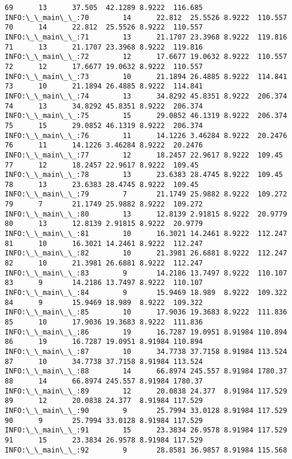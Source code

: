 \documentclass[11pt]{article}
\begin{document}
\begin{Verbatim}[commandchars=\\\{\}]
69      13      37.505  42.1289 8.9222  116.685
INFO:\_\_main\_\_:70        14      22.812  25.5526 8.9222  110.557
70      14      22.812  25.5526 8.9222  110.557
INFO:\_\_main\_\_:71        13      21.1707 23.3968 8.9222  119.816
71      13      21.1707 23.3968 8.9222  119.816
INFO:\_\_main\_\_:72        12      17.6677 19.0632 8.9222  110.557
72      12      17.6677 19.0632 8.9222  110.557
INFO:\_\_main\_\_:73        10      21.1894 26.4885 8.9222  114.841
73      10      21.1894 26.4885 8.9222  114.841
INFO:\_\_main\_\_:74        13      34.8292 45.8351 8.9222  206.374
74      13      34.8292 45.8351 8.9222  206.374
INFO:\_\_main\_\_:75        15      29.0852 46.1319 8.9222  206.374
75      15      29.0852 46.1319 8.9222  206.374
INFO:\_\_main\_\_:76        11      14.1226 3.46284 8.9222  20.2476
76      11      14.1226 3.46284 8.9222  20.2476
INFO:\_\_main\_\_:77        12      18.2457 22.9617 8.9222  109.45
77      12      18.2457 22.9617 8.9222  109.45
INFO:\_\_main\_\_:78        13      23.6383 28.4745 8.9222  109.45
78      13      23.6383 28.4745 8.9222  109.45
INFO:\_\_main\_\_:79        7       21.1749 25.9882 8.9222  109.272
79      7       21.1749 25.9882 8.9222  109.272
INFO:\_\_main\_\_:80        13      12.8139 2.91815 8.9222  20.9779
80      13      12.8139 2.91815 8.9222  20.9779
INFO:\_\_main\_\_:81        10      16.3021 14.2461 8.9222  112.247
81      10      16.3021 14.2461 8.9222  112.247
INFO:\_\_main\_\_:82        10      21.3981 26.6881 8.9222  112.247
82      10      21.3981 26.6881 8.9222  112.247
INFO:\_\_main\_\_:83        9       14.2186 13.7497 8.9222  110.107
83      9       14.2186 13.7497 8.9222  110.107
INFO:\_\_main\_\_:84        9       15.9469 18.989  8.9222  109.322
84      9       15.9469 18.989  8.9222  109.322
INFO:\_\_main\_\_:85        10      17.9036 19.3683 8.9222  111.836
85      10      17.9036 19.3683 8.9222  111.836
INFO:\_\_main\_\_:86        19      16.7287 19.0951 8.91984 110.894
86      19      16.7287 19.0951 8.91984 110.894
INFO:\_\_main\_\_:87        10      34.7738 37.7158 8.91984 113.524
87      10      34.7738 37.7158 8.91984 113.524
INFO:\_\_main\_\_:88        14      66.8974 245.557 8.91984 1780.37
88      14      66.8974 245.557 8.91984 1780.37
INFO:\_\_main\_\_:89        12      20.0838 24.377  8.91984 117.529
89      12      20.0838 24.377  8.91984 117.529
INFO:\_\_main\_\_:90        9       25.7994 33.0128 8.91984 117.529
90      9       25.7994 33.0128 8.91984 117.529
INFO:\_\_main\_\_:91        15      23.3834 26.9578 8.91984 117.529
91      15      23.3834 26.9578 8.91984 117.529
INFO:\_\_main\_\_:92        9       28.8581 36.9857 8.91984 115.568

\end{Verbatim}
\end{document}
